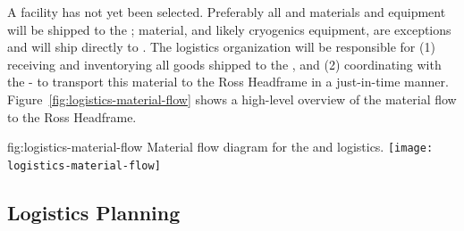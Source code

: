 A facility has not yet been selected. 
Preferably all  and  materials and equipment will be shipped to the ;  material, and likely cryogenics equipment, are exceptions and will ship directly to . 
The logistics  organization will be responsible for (1) receiving and inventorying all  goods shipped to the , and (2) coordinating with the -  to transport this material to the Ross Headframe in a just-in-time manner. 
Figure~\ref{fig:logistics-material-flow} shows a high-level overview of the material flow to the Ross Headframe.


 
\begin{dunefigure}{fig:logistics-material-flow}
  {Material flow diagram for the  and  logistics.}
 \texttt{[image: logistics-material-flow]}
\end{dunefigure}

\subsection{Logistics Planning}
\label{sec:fdsp-tc-logPln}

